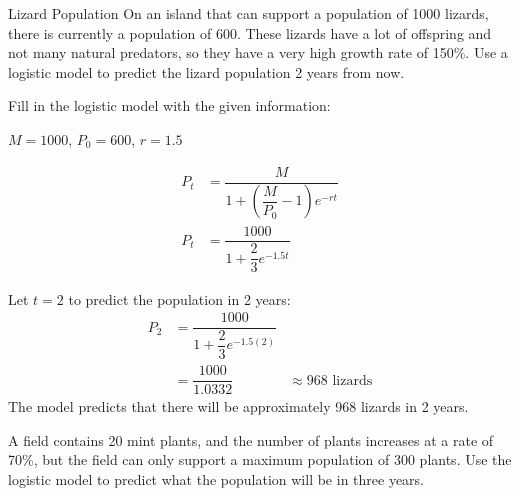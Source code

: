 \begin{example}[https://www.youtube.com/watch?v=cd5xQCfLUZM]{Lizard Population}
On an island that can support a population of 1000 lizards, there is currently a population of 600.  These lizards have a lot of offspring and not many natural predators, so they have a very high growth rate of 150\%.  Use a logistic model to predict the lizard population 2 years from now.

\solline
{}
Fill in the logistic model with the given information:
\begin{center}
$M=1000$, $P_0=600$, $r=1.5$
\end{center}
\begin{align*}
P_t &= \dfrac{M}{1+\left(\dfrac{M}{P_0}-1\right)e^{-rt}}\\
P_t &= \dfrac{1000}{1+\dfrac{2}{3}e^{-1.5t}}
\end{align*}

\begin{center}
\end{center}

Let $t=2$ to predict the population in 2 years:
\begin{align*}
P_2 &= \dfrac{1000}{1+\dfrac{2}{3}e^{-1.5(2)}}\\
 &= \dfrac{1000}{1.0332}
 &\approx \boxed{968 \textrm{ lizards}}
\end{align*}
The model predicts that there will be approximately 968 lizards in 2 years.
\end{example}

\begin{try}
A field contains 20 mint plants, and the number of plants increases at a rate of 70\%, but the field can only support a maximum population of 300 plants.  Use the logistic model to predict what the population will be in three years.
\end{try}

